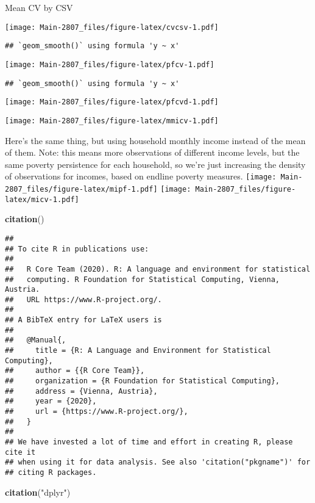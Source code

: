 \documentclass[
]{article}
\newenvironment{Shaded}{\begin{snugshade}}{\end{snugshade}}
\newcommand{\KeywordTok}[1]{\textcolor[rgb]{0.13,0.29,0.53}{\textbf{#1}}}
\newcommand{\NormalTok}[1]{#1}
\newcommand{\StringTok}[1]{\textcolor[rgb]{0.31,0.60,0.02}{#1}}
\begin{document}
Mean CV by CSV

\texttt{[image: Main-2807\_files/figure-latex/cvcsv-1.pdf]}

\begin{verbatim}
## `geom_smooth()` using formula 'y ~ x'
\end{verbatim}

\texttt{[image: Main-2807\_files/figure-latex/pfcv-1.pdf]}

\begin{verbatim}
## `geom_smooth()` using formula 'y ~ x'
\end{verbatim}

\texttt{[image: Main-2807\_files/figure-latex/pfcvd-1.pdf]}

\texttt{[image: Main-2807\_files/figure-latex/mmicv-1.pdf]}

Here's the same thing, but using household monthly income instead of the
mean of them. Note: this means more observations of different income
levels, but the same poverty persistence for each household, so we're
just increasing the density of observations for incomes, based on
endline poverty measures.
\texttt{[image: Main-2807\_files/figure-latex/mipf-1.pdf]}
\texttt{[image: Main-2807\_files/figure-latex/micv-1.pdf]}

\begin{Shaded}
\begin{Highlighting}[]
\KeywordTok{citation}\NormalTok{()}
\end{Highlighting}
\end{Shaded}

\begin{verbatim}
## 
## To cite R in publications use:
## 
##   R Core Team (2020). R: A language and environment for statistical
##   computing. R Foundation for Statistical Computing, Vienna, Austria.
##   URL https://www.R-project.org/.
## 
## A BibTeX entry for LaTeX users is
## 
##   @Manual{,
##     title = {R: A Language and Environment for Statistical Computing},
##     author = {{R Core Team}},
##     organization = {R Foundation for Statistical Computing},
##     address = {Vienna, Austria},
##     year = {2020},
##     url = {https://www.R-project.org/},
##   }
## 
## We have invested a lot of time and effort in creating R, please cite it
## when using it for data analysis. See also 'citation("pkgname")' for
## citing R packages.
\end{verbatim}

\begin{Shaded}
\begin{Highlighting}[]
\KeywordTok{citation}\NormalTok{(}\StringTok{"dplyr"}\NormalTok{)}
\end{Highlighting}
\end{Shaded}
\end{document}
